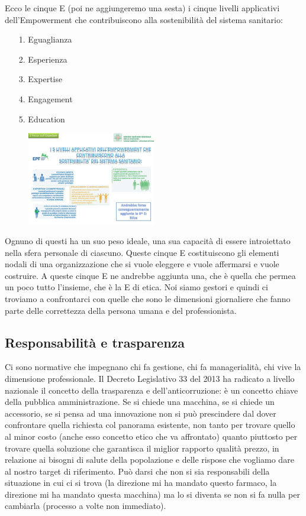 Ecco le cinque E (poi ne aggiungeremo una sesta) i cinque livelli
applicativi dell'Empowerment che contribuiscono alla sostenibilità del
sistema sanitario:

\begin{itemize}
\item[1.]
  Eguaglianza
\item[2.]
  Esperienza
\item[3.]
  Expertise
\item[4.]
  Engagement
\item[5.]
  Education
\end{itemize}

 \begin{figure}[!ht]
\centering
	\includegraphics[width=0.5\textwidth]{32/image13.jpeg}
	\end{figure}

Ognuno di questi ha un suo peso ideale, una sua capacità di essere
introiettato nella sfera personale di ciascuno. Queste cinque E
costituiscono gli elementi nodali di una organizzazione che si vuole
eleggere e vuole affermarsi e vuole costruire. A queste cinque E ne
andrebbe aggiunta una, che è quella che permea un poco tutto l'insieme,
che è la E di etica. Noi siamo gestori e quindi ci troviamo a
confrontarci con quelle che sono le dimensioni giornaliere che fanno
parte delle correttezza della persona umana e del professionista.

\subsection{Responsabilità e trasparenza}

Ci sono normative che impegnano chi fa gestione, chi fa managerialità,
chi vive la dimensione professionale. Il Decreto Legislativo 33 del 2013
ha radicato a livello nazionale il concetto della trasparenza e
dell'anticorruzione: è un concetto chiave della pubblica
amministrazione. Se si chiede una macchina, se si chiede un accessorio,
se si pensa ad una innovazione non si può prescindere dal dover
confrontare quella richiesta col panorama esistente, non tanto per
trovare quello al minor costo (anche esso concetto etico che va
affrontato) quanto piuttosto per trovare quella soluzione che garantisca
il miglior rapporto qualità prezzo, in relazione ai bisogni di salute
della popolazione e delle rispose che vogliamo dare al nostro target di
riferimento. Può darsi che non si sia responsabili della situazione in
cui ci si trova (la direzione mi ha mandato questo farmaco, la direzione
mi ha mandato questa macchina) ma lo si diventa se non si fa nulla per
cambiarla (processo a volte non immediato).

